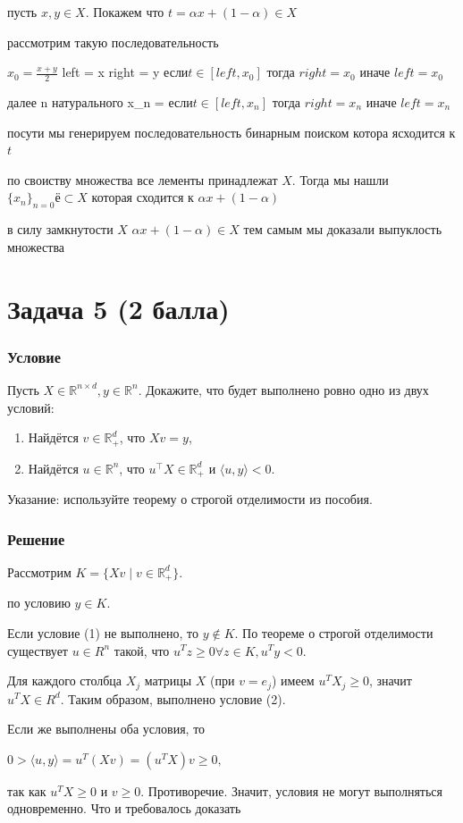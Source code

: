 \documentclass[10pt]{article}
\begin{document}
пусть $x, y \in X$. Покажем что $t = \alpha x + (1-\alpha) \in X$

рассмотрим такую последовательность

$x_0 = \frac{x+y}{2}$
left = x
right = y
если$ t \in [left, x_0]$
тогда $right = x_0$
иначе $left = x_0$

далее \forall n натурального
x_n = 
если$ t \in [left, x_{n}]$
тогда $right = x_n$
иначе $left = x_n$

посути мы генерируем последовательность бинарным поиском котора ясходится к $t$

по своиству множества все лементы принадлежат $X$. Тогда мы нашли $\{ x_n \}_{n=0} ё\subset X$ которая сходится к  $\alpha x + (1-\alpha)$

в силу замкнутости $X$ $\alpha x + (1-\alpha) \in X$
тем самым мы доказали выпуклость множества

\section{Задача 5 (2 балла)}

\subsubsection{Условие}

Пусть $X \in \mathbb{R}^{n \times d}, y \in \mathbb{R}^{n}$. Докажите, что будет выполнено ровно одно из двух условий:
\begin{enumerate}
  \item Найдётся $v \in \mathbb{R}_{+}^{d}$, что $X v=y$,
  \item Найдётся $u \in \mathbb{R}^{n}$, что $u^{\top} X \in \mathbb{R}_{+}^{d}$ и $\langle u, y\rangle<0$.
\end{enumerate}
Указание: используйте теорему о строгой отделимости из пособия.

\subsubsection{Решение}

Рассмотрим  $K = \{Xv \mid v \in \mathbb{R}_+^d\}.$

по условию $y \in K$.

Если условие (1) не выполнено, то $y \notin K$. По теореме о строгой отделимости существует $u \in R^n$ такой, что $u^T z \geq 0 \forall z \in K, u^T y < 0.$

Для каждого столбца $X_j$ матрицы $X$ (при $v = e_j$) имеем $u^T X_j \geq 0$, значит $u^T X \in R^d$. Таким образом, выполнено условие (2).

Если же выполнены оба условия, то

$0 > \langle u, y \rangle = u^T (Xv) = (u^T X) v \geq 0,$

так как $u^T X \geq 0$ и $v \geq 0$. Противоречие. Значит, условия не могут выполняться одновременно. Что и требовалось доказать
\end{document}
